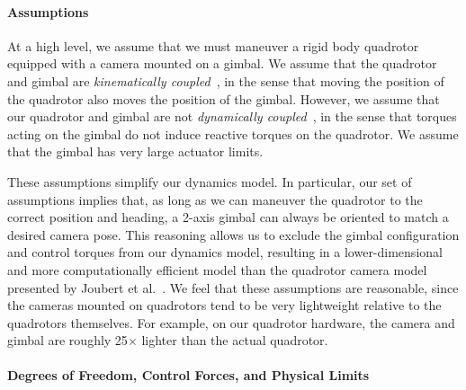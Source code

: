 \paragraph{Assumptions}

At a high level, we assume that we must maneuver a rigid body quadrotor equipped with a camera mounted on a gimbal. 
We assume that the quadrotor and gimbal are \emph{kinematically coupled}~\cite{kondak:2013}, in the sense that moving the position of the quadrotor also moves the position of the gimbal.
However, we assume that our quadrotor and gimbal are not \emph{dynamically coupled}~\cite{kondak:2013}, in the sense that torques acting on the gimbal do not induce reactive torques on the quadrotor.
We assume that the gimbal has very large actuator limits.

These assumptions simplify our dynamics model. 
In particular, our set of assumptions implies that, as long as we can maneuver the quadrotor to the correct position and heading, a 2-axis gimbal can always be oriented to match a desired camera pose.
This reasoning allows us to exclude the gimbal configuration and control torques from our dynamics model, resulting in a lower-dimensional and more computationally efficient model than the quadrotor camera model presented by Joubert et al.~.
We feel that these assumptions are reasonable, since the cameras mounted on quadrotors tend to be very lightweight relative to the quadrotors themselves.
For example, on our quadrotor hardware, the camera and gimbal are roughly 25$\times$ lighter than the actual quadrotor.

\paragraph{Degrees of Freedom, Control Forces, and Physical Limits}

